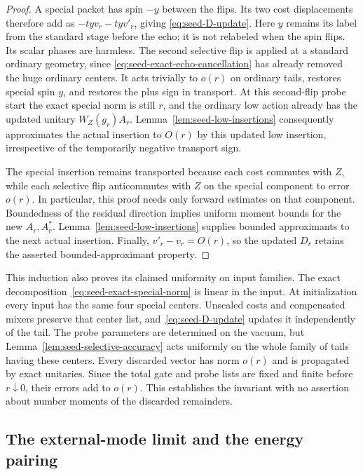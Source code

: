 \begin{proof}
A special packet has spin \(-y\) between the flips.  Its two cost
displacements therefore add as \(-tyv_r-tyv'_r\), giving
\eqref{eq:seed-D-update}.  Here \(y\) remains its label from the
standard stage before the echo; it is not relabeled when the spin
flips.  Its scalar phases are harmless.  The second
selective flip is applied at a standard ordinary geometry, since
\eqref{eq:seed-exact-echo-cancellation} has already removed the huge
ordinary centers.  It acts trivially to \(o(r)\) on ordinary tails,
restores special spin \(y\), and restores the plus sign in transport.
At this second-flip probe start the exact special norm is still \(r\),
and the ordinary low action already has the updated unitary
\(W_Z(g_r)A_r\).  Lemma~\ref{lem:seed-low-insertions} consequently
approximates the actual insertion to \(O(r)\) by this updated low
insertion, irrespective of the temporarily negative transport sign.

The special insertion remains transported because each cost commutes
with \(Z\), while each selective flip anticommutes with \(Z\) on the
special component to error \(o(r)\).  In particular, this proof needs
only forward estimates on that component.  Boundedness of the residual
direction implies uniform moment bounds for the new \(A_r,A_r^*\).
Lemma~\ref{lem:seed-low-insertions} supplies bounded approximants to
the next actual insertion.  Finally, \(v'_r-v_r=O(r)\), so the updated
\(D_r\) retains the asserted bounded-approximant property.
\end{proof}

This induction also proves its claimed uniformity on input families.
The exact decomposition~\eqref{eq:seed-exact-special-norm} is linear in
the input.  At initialization every input has the same four special
centers.  Unscaled costs and compensated mixers preserve that center
list, and~\eqref{eq:seed-D-update} updates it independently of the tail.
The probe parameters are determined on the vacuum, but
Lemma~\ref{lem:seed-selective-accuracy} acts uniformly on the whole
family of tails having these centers.  Every discarded vector has norm
\(o(r)\) and is propagated by exact unitaries.  Since the total gate
and probe lists are fixed and finite before \(r\downarrow0\), their
errors add to \(o(r)\).  This establishes the invariant with no
assertion about number moments of the discarded remainders.

\subsection{The external-mode limit and the energy pairing}

